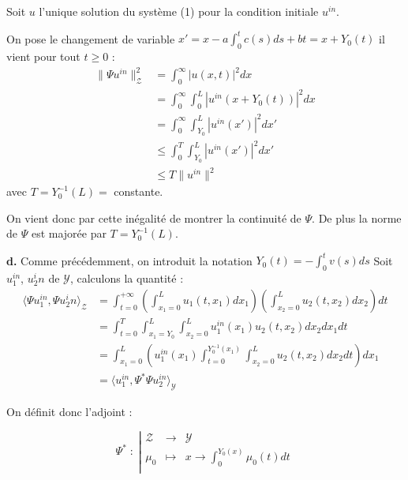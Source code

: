 \documentclass[a4paper]{article}
\newcommand{\Y}{\mathscr{Y}}
\newcommand{\Z}{\mathscr{Z}}
\begin{document}
Soit $u$ l'unique solution du système (1) pour la condition initiale $u^{in}$.

On pose le changement de variable $x'=x - a\int_0^tc(s)ds + bt = x + Y_0 (t)$ il vient pour tout $t \geq 0$ :
\[ \begin{split}
\|\Psi u^{in}\|_{\Z}^2 &= \int_0^\infty |u(x,t)|^2 dx \\
			   &= \int_0^\infty \int_0^L |u^{in}( x + Y_0 (t))|^2 dx \\
			   &= \int_0^\infty \int_{Y_0}^{L} |u^{in}(x')|^2 dx' \\
			   & \leq \int_0^T \int_{Y_0}^L |u^{in}(x')|^2 dx'\\
			   & \leq T \| u^{in} \|^2
\end{split}\]
avec $T = Y_0^{-1}(L) =$ constante.

On vient donc par cette inégalité de montrer la continuité de $\Psi$. De plus la norme de $\Psi$ est majorée par $T = Y_0 ^{-1}(L)$.

\textbf{d.}
Comme précédemment, on introduit la notation $Y_0(t)= -\int_0^t v(s)ds$
Soit $u_1^{in}$, $u_2^in$ de $\mathscr{Y}$,
calculons la quantité :
\[
\begin{split}
	\langle \Psi u_1^{in}, \Psi u_2^in \rangle_{\mathscr{Z}}  
	                                  &= \int_{t=0}^{+\infty} 
									  (\int_{x_1=0}^L u_1(t,x_1)dx_1)
									  (\int_{x_2=0}^L u_2(t,x_2) dx_2)
									  dt\\
	                                  &= \int_{t=0}^{T} 
									  \int_{x_1=Y_0}^L \int_{x_2=0}^L
									  u_1^{in}(x_1)
									   u_2(t,x_2) 
									  dx_2dx_1dt\\
	                                  &= \int_{x_1=0}^L
									  (u_1^{in}(x_1)
									  \int_{t=0}^{Y_0^{-1}(x_1)} 
									   \int_{x_2=0}^L
									   u_2(t,x_2) 
									  dx_2 dt )dx_1\\
	                                  &= \langle u_1^{in},
									  \Psi^* \Psi u_2^{in} \rangle_{\mathscr{Y}}
\end{split}
\]

On définit donc l'adjoint :

\begin{equation}
	 \Psi^* \; : \; \left\vert
	\begin{array}{ccc}
	\Z & \to & \Y \\
	\mu_0 & \mapsto & x \to \int_0^{Y_0(x)} \mu_0(t)dt \\
	\end{array} \right.
\end{equation}
\end{document}
